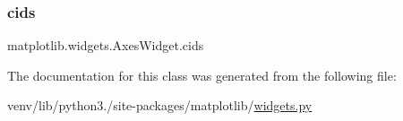 \subsubsection{\texorpdfstring{cids}{cids}}
{\footnotesize\ttfamily matplotlib.\+widgets.\+Axes\+Widget.\+cids\hspace{0.3cm}{\ttfamily [static]}}



The documentation for this class was generated from the following file\+:\begin{DoxyCompactItemize}
\item 
venv/lib/python3./site-\/packages/matplotlib/\hyperlink{widgets_8py}{widgets.\+py}\end{DoxyCompactItemize}
